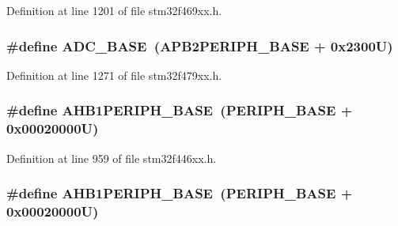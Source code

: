 Definition at line 1201 of file stm32f469xx.\+h.

\subsubsection[{\texorpdfstring{A\+D\+C\+\_\+\+B\+A\+SE}{ADC_BASE}}]{\setlength{\rightskip}{0pt plus 5cm}\#define A\+D\+C\+\_\+\+B\+A\+SE~({\bf A\+P\+B2\+P\+E\+R\+I\+P\+H\+\_\+\+B\+A\+SE} + 0x2300\+U)}\hypertarget{group___peripheral__memory__map_gad06cb9e5985bd216a376f26f22303cd6}{}\label{group___peripheral__memory__map_gad06cb9e5985bd216a376f26f22303cd6}


Definition at line 1271 of file stm32f479xx.\+h.

\subsubsection[{\texorpdfstring{A\+H\+B1\+P\+E\+R\+I\+P\+H\+\_\+\+B\+A\+SE}{AHB1PERIPH_BASE}}]{\setlength{\rightskip}{0pt plus 5cm}\#define A\+H\+B1\+P\+E\+R\+I\+P\+H\+\_\+\+B\+A\+SE~({\bf P\+E\+R\+I\+P\+H\+\_\+\+B\+A\+SE} + 0x00020000\+U)}\hypertarget{group___peripheral__memory__map_ga811a9a4ca17f0a50354a9169541d56c4}{}\label{group___peripheral__memory__map_ga811a9a4ca17f0a50354a9169541d56c4}


Definition at line 959 of file stm32f446xx.\+h.

\subsubsection[{\texorpdfstring{A\+H\+B1\+P\+E\+R\+I\+P\+H\+\_\+\+B\+A\+SE}{AHB1PERIPH_BASE}}]{\setlength{\rightskip}{0pt plus 5cm}\#define A\+H\+B1\+P\+E\+R\+I\+P\+H\+\_\+\+B\+A\+SE~({\bf P\+E\+R\+I\+P\+H\+\_\+\+B\+A\+SE} + 0x00020000\+U)}\hypertarget{group___peripheral__memory__map_ga811a9a4ca17f0a50354a9169541d56c4}{}\label{group___peripheral__memory__map_ga811a9a4ca17f0a50354a9169541d56c4}


